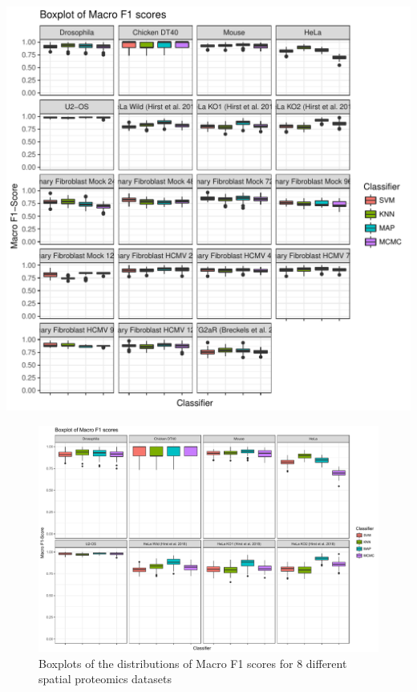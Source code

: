 \documentclass[12pt,english]{article}\usepackage[]{graphicx}\usepackage[]{color}
\makeatletter
\def\maxwidth{ %
  \ifdim\Gin@nat@width>\linewidth
    \linewidth
  \else
    \Gin@nat@width
  \fi
}
\newenvironment{kframe}{%
 \def\at@end@of@kframe{}%
 \ifinner\ifhmode%
  \def\at@end@of@kframe{\end{minipage}}%
  \begin{minipage}{\columnwidth}%
 \fi\fi%
 \def\FrameCommand##1{\hskip\@totalleftmargin \hskip-\fboxsep
 \colorbox{shadecolor}{##1}\hskip-\fboxsep
     \hskip-\linewidth \hskip-\@totalleftmargin \hskip\columnwidth}%
 \MakeFramed {\advance\hsize-\width
   \@totalleftmargin\z@ \linewidth\hsize
   \@setminipage}}%
 {\par\unskip\endMakeFramed%
 \at@end@of@kframe}
\newenvironment{knitrout}{}{} %
\makeatother
\begin{document}
\begin{knitrout}
\color{fgcolor}\begin{kframe}


{\ttfamily\noindent\itshape\color{messagecolor}{\#\# Using\ \ as id variables\\\#\# Using\ \ as id variables\\\#\# Using\ \ as id variables\\\#\# Using\ \ as id variables\\\#\# Using\ \ as id variables}}\end{kframe}
\includegraphics[width=\maxwidth]{figure/unnamed-chunk-9-1} 

\end{knitrout}

\begin{figure}[ht]
  \centering
\includegraphics[width=\textwidth]{F1compare1.pdf}
  \caption{Boxplots of the distributions of Macro F1 scores
    for 8 different spatial proteomics datasets}
  \label{figure::f1scores1}
\end{figure}
\end{document}
